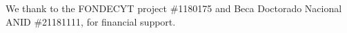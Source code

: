 \documentclass[aps,pra,preprint,superscriptaddress, showpacs]{revtex4-2}
\begin{document}

\begin{acknowledgments}
	We thank to the FONDECYT project \#1180175 and Beca Doctorado Nacional ANID \#21181111, for financial support.
\end{acknowledgments}









\end{document}
